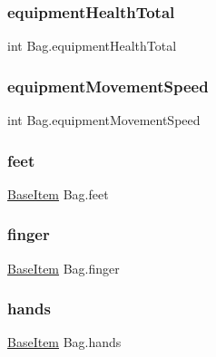\subsubsection{\texorpdfstring{equipmentHealthTotal}{equipmentHealthTotal}}
{\footnotesize\ttfamily int Bag.\+equipment\+Health\+Total\hspace{0.3cm}{\ttfamily [get]}}

\mbox{\label{class_bag_ad551aa1b82517235b92383220f44ed4c}} 
\subsubsection{\texorpdfstring{equipmentMovementSpeed}{equipmentMovementSpeed}}
{\footnotesize\ttfamily int Bag.\+equipment\+Movement\+Speed\hspace{0.3cm}{\ttfamily [get]}}

\mbox{\label{class_bag_a45172ef71e457ce9c818866fc0ffd5c2}} 
\subsubsection{\texorpdfstring{feet}{feet}}
{\footnotesize\ttfamily \mbox{\hyperlink{class_base_item}{Base\+Item}} Bag.\+feet\hspace{0.3cm}{\ttfamily [get]}}

\mbox{\label{class_bag_a0517877fdabd6917389995deecabe057}} 
\subsubsection{\texorpdfstring{finger}{finger}}
{\footnotesize\ttfamily \mbox{\hyperlink{class_base_item}{Base\+Item}} Bag.\+finger\hspace{0.3cm}{\ttfamily [get]}}

\mbox{\label{class_bag_a19700ba62882ea2e03f954a6b4f267fa}} 
\subsubsection{\texorpdfstring{hands}{hands}}
{\footnotesize\ttfamily \mbox{\hyperlink{class_base_item}{Base\+Item}} Bag.\+hands\hspace{0.3cm}{\ttfamily [get]}}

